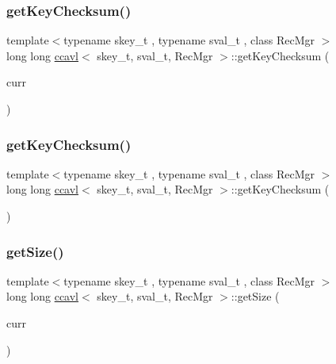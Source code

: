\mbox{\label{classccavl_a8722026efe4a180eefd9fd5a535b8930}} 
\subsubsection{\texorpdfstring{get\+Key\+Checksum()}{getKeyChecksum()}\hspace{0.1cm}{\footnotesize\ttfamily [1/2]}}
{\footnotesize\ttfamily template$<$typename skey\+\_\+t , typename sval\+\_\+t , class Rec\+Mgr $>$ \\
long long \hyperlink{classccavl}{ccavl}$<$ skey\+\_\+t, sval\+\_\+t, Rec\+Mgr $>$\+::get\+Key\+Checksum (\begin{DoxyParamCaption}\item[{\hyperlink{structnode__t}{node\+\_\+t}$<$ skey\+\_\+t, sval\+\_\+t $>$ $\ast$}]{curr }\end{DoxyParamCaption})\hspace{0.3cm}{\ttfamily [inline]}}

\mbox{\label{classccavl_aad58da3e9edfdc382a5dc434505e1ba0}} 
\subsubsection{\texorpdfstring{get\+Key\+Checksum()}{getKeyChecksum()}\hspace{0.1cm}{\footnotesize\ttfamily [2/2]}}
{\footnotesize\ttfamily template$<$typename skey\+\_\+t , typename sval\+\_\+t , class Rec\+Mgr $>$ \\
long long \hyperlink{classccavl}{ccavl}$<$ skey\+\_\+t, sval\+\_\+t, Rec\+Mgr $>$\+::get\+Key\+Checksum (\begin{DoxyParamCaption}{ }\end{DoxyParamCaption})\hspace{0.3cm}{\ttfamily [inline]}}

\mbox{\label{classccavl_a6777e1819dbd5db66a28d859b01d147e}} 
\subsubsection{\texorpdfstring{get\+Size()}{getSize()}\hspace{0.1cm}{\footnotesize\ttfamily [1/2]}}
{\footnotesize\ttfamily template$<$typename skey\+\_\+t , typename sval\+\_\+t , class Rec\+Mgr $>$ \\
long long \hyperlink{classccavl}{ccavl}$<$ skey\+\_\+t, sval\+\_\+t, Rec\+Mgr $>$\+::get\+Size (\begin{DoxyParamCaption}\item[{\hyperlink{structnode__t}{node\+\_\+t}$<$ skey\+\_\+t, sval\+\_\+t $>$ $\ast$}]{curr }\end{DoxyParamCaption})\hspace{0.3cm}{\ttfamily [inline]}}


